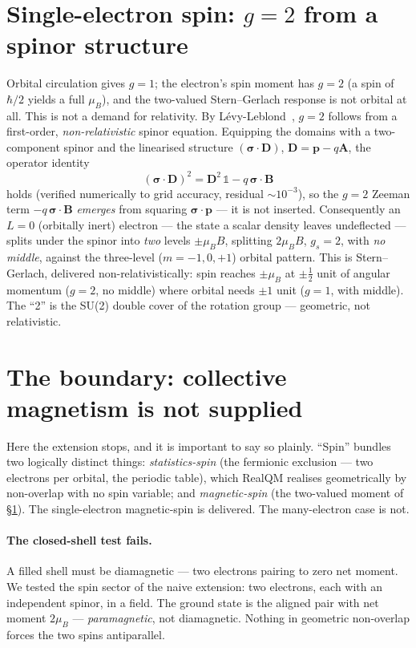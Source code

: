 \documentclass[11pt]{article}
\begin{document}
\section{Single-electron spin: $g=2$ from a spinor structure}
\label{sec:spinor}

Orbital circulation gives $g=1$; the electron's spin moment has $g=2$ (a spin of $\hbar/2$ yields a full
$\mu_B$), and the two-valued Stern--Gerlach response is not orbital at all. This is not a demand for
relativity. By Lévy-Leblond~\cite{LevyLeblond}, $g=2$ follows from a first-order, \emph{non-relativistic}
spinor equation. Equipping the domains with a two-component spinor and the linearised structure
$(\boldsymbol\sigma\cdot\mathbf D)$, $\mathbf D=\mathbf p-q\mathbf A$, the operator identity
\begin{equation}
(\boldsymbol\sigma\cdot\mathbf D)^2=\mathbf D^2\,\mathbb 1-q\,\boldsymbol\sigma\cdot\mathbf B
\label{eq:pauli}
\end{equation}
holds (verified numerically to grid accuracy, residual $\sim10^{-3}$), so the $g=2$ Zeeman term
$-q\,\boldsymbol\sigma\cdot\mathbf B$ \emph{emerges} from squaring $\boldsymbol\sigma\cdot\mathbf p$ --- it
is not inserted. Consequently an $L=0$ (orbitally inert) electron --- the state a scalar density leaves
undeflected --- splits under the spinor into \emph{two} levels $\pm\mu_B B$, splitting $2\mu_B B$,
$g_s=2$, with \emph{no middle}, against the three-level ($m=-1,0,+1$) orbital pattern. This is
Stern--Gerlach, delivered non-relativistically: spin reaches $\pm\mu_B$ at $\pm\tfrac12$ unit of angular
momentum ($g=2$, no middle) where orbital needs $\pm1$ unit ($g=1$, with middle). The ``2'' is the SU(2)
double cover of the rotation group --- geometric, not relativistic.

\section{The boundary: collective magnetism is not supplied}
\label{sec:limit}

Here the extension stops, and it is important to say so plainly. ``Spin'' bundles two logically distinct
things: \emph{statistics-spin} (the fermionic exclusion --- two electrons per orbital, the periodic
table), which RealQM realises geometrically by non-overlap with no spin variable; and \emph{magnetic-spin}
(the two-valued moment of \S\ref{sec:spinor}). The single-electron magnetic-spin is delivered. The
many-electron case is not.

\paragraph{The closed-shell test fails.} A filled shell must be diamagnetic --- two electrons pairing to
zero net moment. We tested the spin sector of the naive extension: two electrons, each with an independent
spinor, in a field. The ground state is the aligned pair with net moment $2\mu_B$ --- \emph{paramagnetic},
not diamagnetic. Nothing in geometric non-overlap forces the two spins antiparallel.
\end{document}
